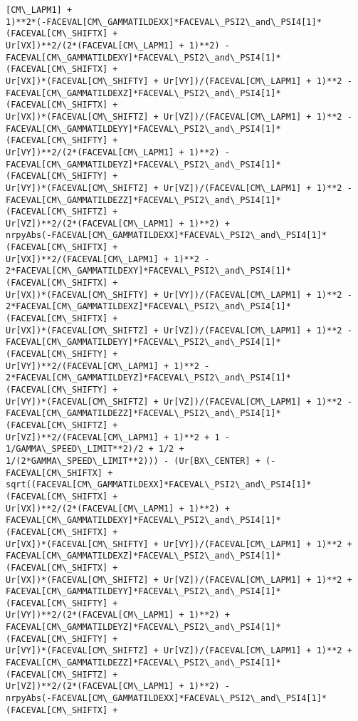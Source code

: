 \documentclass[landscape,letterpaper,10pt,english]{article}
\begin{document}
\begin{Verbatim}[commandchars=\\\{\}]
[CM\_LAPM1] +
1)**2*(-FACEVAL[CM\_GAMMATILDEXX]*FACEVAL\_PSI2\_and\_PSI4[1]*(FACEVAL[CM\_SHIFTX] +
Ur[VX])**2/(2*(FACEVAL[CM\_LAPM1] + 1)**2) -
FACEVAL[CM\_GAMMATILDEXY]*FACEVAL\_PSI2\_and\_PSI4[1]*(FACEVAL[CM\_SHIFTX] +
Ur[VX])*(FACEVAL[CM\_SHIFTY] + Ur[VY])/(FACEVAL[CM\_LAPM1] + 1)**2 -
FACEVAL[CM\_GAMMATILDEXZ]*FACEVAL\_PSI2\_and\_PSI4[1]*(FACEVAL[CM\_SHIFTX] +
Ur[VX])*(FACEVAL[CM\_SHIFTZ] + Ur[VZ])/(FACEVAL[CM\_LAPM1] + 1)**2 -
FACEVAL[CM\_GAMMATILDEYY]*FACEVAL\_PSI2\_and\_PSI4[1]*(FACEVAL[CM\_SHIFTY] +
Ur[VY])**2/(2*(FACEVAL[CM\_LAPM1] + 1)**2) -
FACEVAL[CM\_GAMMATILDEYZ]*FACEVAL\_PSI2\_and\_PSI4[1]*(FACEVAL[CM\_SHIFTY] +
Ur[VY])*(FACEVAL[CM\_SHIFTZ] + Ur[VZ])/(FACEVAL[CM\_LAPM1] + 1)**2 -
FACEVAL[CM\_GAMMATILDEZZ]*FACEVAL\_PSI2\_and\_PSI4[1]*(FACEVAL[CM\_SHIFTZ] +
Ur[VZ])**2/(2*(FACEVAL[CM\_LAPM1] + 1)**2) +
nrpyAbs(-FACEVAL[CM\_GAMMATILDEXX]*FACEVAL\_PSI2\_and\_PSI4[1]*(FACEVAL[CM\_SHIFTX] +
Ur[VX])**2/(FACEVAL[CM\_LAPM1] + 1)**2 -
2*FACEVAL[CM\_GAMMATILDEXY]*FACEVAL\_PSI2\_and\_PSI4[1]*(FACEVAL[CM\_SHIFTX] +
Ur[VX])*(FACEVAL[CM\_SHIFTY] + Ur[VY])/(FACEVAL[CM\_LAPM1] + 1)**2 -
2*FACEVAL[CM\_GAMMATILDEXZ]*FACEVAL\_PSI2\_and\_PSI4[1]*(FACEVAL[CM\_SHIFTX] +
Ur[VX])*(FACEVAL[CM\_SHIFTZ] + Ur[VZ])/(FACEVAL[CM\_LAPM1] + 1)**2 -
FACEVAL[CM\_GAMMATILDEYY]*FACEVAL\_PSI2\_and\_PSI4[1]*(FACEVAL[CM\_SHIFTY] +
Ur[VY])**2/(FACEVAL[CM\_LAPM1] + 1)**2 -
2*FACEVAL[CM\_GAMMATILDEYZ]*FACEVAL\_PSI2\_and\_PSI4[1]*(FACEVAL[CM\_SHIFTY] +
Ur[VY])*(FACEVAL[CM\_SHIFTZ] + Ur[VZ])/(FACEVAL[CM\_LAPM1] + 1)**2 -
FACEVAL[CM\_GAMMATILDEZZ]*FACEVAL\_PSI2\_and\_PSI4[1]*(FACEVAL[CM\_SHIFTZ] +
Ur[VZ])**2/(FACEVAL[CM\_LAPM1] + 1)**2 + 1 - 1/GAMMA\_SPEED\_LIMIT**2)/2 + 1/2 +
1/(2*GAMMA\_SPEED\_LIMIT**2))) - (Ur[BX\_CENTER] + (-FACEVAL[CM\_SHIFTX] +
sqrt((FACEVAL[CM\_GAMMATILDEXX]*FACEVAL\_PSI2\_and\_PSI4[1]*(FACEVAL[CM\_SHIFTX] +
Ur[VX])**2/(2*(FACEVAL[CM\_LAPM1] + 1)**2) +
FACEVAL[CM\_GAMMATILDEXY]*FACEVAL\_PSI2\_and\_PSI4[1]*(FACEVAL[CM\_SHIFTX] +
Ur[VX])*(FACEVAL[CM\_SHIFTY] + Ur[VY])/(FACEVAL[CM\_LAPM1] + 1)**2 +
FACEVAL[CM\_GAMMATILDEXZ]*FACEVAL\_PSI2\_and\_PSI4[1]*(FACEVAL[CM\_SHIFTX] +
Ur[VX])*(FACEVAL[CM\_SHIFTZ] + Ur[VZ])/(FACEVAL[CM\_LAPM1] + 1)**2 +
FACEVAL[CM\_GAMMATILDEYY]*FACEVAL\_PSI2\_and\_PSI4[1]*(FACEVAL[CM\_SHIFTY] +
Ur[VY])**2/(2*(FACEVAL[CM\_LAPM1] + 1)**2) +
FACEVAL[CM\_GAMMATILDEYZ]*FACEVAL\_PSI2\_and\_PSI4[1]*(FACEVAL[CM\_SHIFTY] +
Ur[VY])*(FACEVAL[CM\_SHIFTZ] + Ur[VZ])/(FACEVAL[CM\_LAPM1] + 1)**2 +
FACEVAL[CM\_GAMMATILDEZZ]*FACEVAL\_PSI2\_and\_PSI4[1]*(FACEVAL[CM\_SHIFTZ] +
Ur[VZ])**2/(2*(FACEVAL[CM\_LAPM1] + 1)**2) -
nrpyAbs(-FACEVAL[CM\_GAMMATILDEXX]*FACEVAL\_PSI2\_and\_PSI4[1]*(FACEVAL[CM\_SHIFTX] +

\end{Verbatim}
\end{document}
